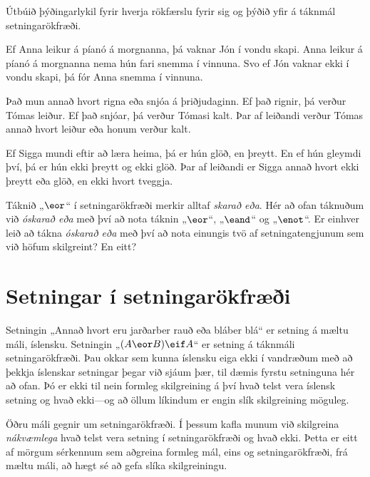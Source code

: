 \problempart
Útbúið þýðingarlykil fyrir hverja rökfærslu fyrir sig og þýðið yfir á táknmál setningarökfræði.

\begin{earg}
\item Ef Anna leikur á píanó á morgnanna, þá vaknar Jón í vondu skapi. Anna leikur á píanó á morgnanna nema hún fari snemma í vinnuna. Svo ef Jón vaknar ekki í vondu skapi, þá fór Anna snemma í vinnuna.
\item Það mun annað hvort rigna eða snjóa á þriðjudaginn. Ef það rignir, þá verður Tómas leiður. Ef það snjóar, þá verður Tómasi kalt. Þar af leiðandi verður Tómas annað hvort leiður eða honum verður kalt.
\item Ef Sigga mundi eftir að læra heima, þá er hún glöð, en þreytt. En ef hún gleymdi því, þá er hún ekki þreytt og ekki glöð. Þar af leiðandi er Sigga annað hvort ekki þreytt eða glöð, en ekki hvort tveggja.
\end{earg}

\problempart
Táknið „$\eor$“ í setningarökfræði merkir alltaf \emph{skarað eða}. Hér að ofan táknuðum við \emph{óskarað eða} með því að nota táknin „$\eor$“, „$\eand$“ og „$\enot$“. Er einhver leið að tákna \emph{óskarað eða} með því að nota einungis tvö af setningatengjunum sem við höfum skilgreint? En eitt?

\chapter{Setningar í setningarökfræði}\label{s:TFLSentences}
Setningin „Annað hvort eru jarðarber rauð eða bláber blá“ er setning á mæltu máli, íslensku. Setningin „$(A \eor B) \eif A$“ er setning á táknmáli setningarökfræði. Þau okkar sem kunna íslensku eiga ekki í vandræðum með að þekkja íslenskar setningar þegar við sjáum þær, til dæmis fyrstu setninguna hér að ofan. Þó er ekki til nein formleg skilgreining á því hvað telst vera íslensk setning og hvað ekki---og að öllum líkindum er engin slík skilgreining möguleg. 

Öðru máli gegnir um setningarökfræði. Í þessum kafla munum við skilgreina \emph{nákvæmlega} hvað telst vera setning í setningarökfræði og hvað ekki. Þetta er eitt af mörgum sérkennum sem aðgreina formleg mál, eins og setningarökfræði, frá mæltu máli, að hægt sé að gefa slíka skilgreiningu.

